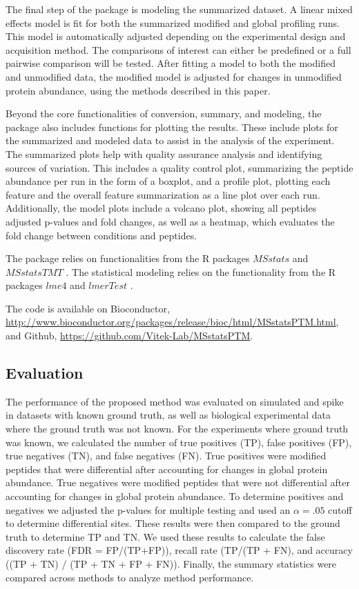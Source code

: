 \documentclass[mcp]{article}
\numberwithin{table}{section}
\begin{document}
The final step of the package is modeling the summarized dataset. A linear mixed effects model is fit for both the summarized modified and global profiling runs. This model is automatically adjusted depending on the experimental design and acquisition method. The comparisons of interest can either be predefined or a full pairwise comparison will be tested. After fitting a model to both the modified and unmodified data, the modified model is adjusted for changes in unmodified protein abundance, using the methods described in this paper. 

Beyond the core functionalities of conversion, summary, and modeling, the package also includes functions for plotting the results. These include plots for the summarized and modeled data to assist in the analysis of the experiment. The summarized plots help with quality assurance analysis and identifying sources of variation. This includes a quality control plot, summarizing the peptide abundance per run in the form of a boxplot, and a profile plot, plotting each feature and the overall feature summarization as a line plot over each run. Additionally, the model plots include a volcano plot, showing all peptides adjusted p-values and fold changes, as well as a heatmap, which evaluates the fold change between conditions and peptides. 

The package relies on functionalities from the R packages $MSstats$ \cite{Choi:2014} and $MSstatsTMT$ \cite{Huang:2020}. The statistical modeling relies on the functionality from the R packages $lme4$ \cite{Bates2015} and $lmerTest$ \cite{Kuznetsova2017}.

The code is available on Bioconductor, \url{http://www.bioconductor.org/packages/release/bioc/html/MSstatsPTM.html}, and Github, \url{https://github.com/Vitek-Lab/MSstatsPTM}.

\subsection*{Evaluation}

The performance of the proposed method was evaluated on simulated and spike in datasets with known ground truth, as well as biological experimental data where the ground truth was not known. For the experiments where ground truth was known, we calculated the number of true positives (TP), false positives (FP), true negatives (TN), and false negatives (FN). True positives were modified peptides that were differential after accounting for changes in global protein abundance. True negatives were modified peptides that were not differential after accounting for changes in global protein abundance. To determine positives and negatives we adjusted the p-values for multiple testing and used an $\alpha=.05$ cutoff to determine differential sites. These results were then compared to the ground truth to determine TP and TN. We used these results to calculate the false discovery rate (FDR = FP/(TP+FP)), recall rate (TP/(TP + FN), and accuracy ((TP + TN) / (TP + TN + FP + FN)). Finally, the summary statistics were compared across methods to analyze method performance. 
\end{document}
